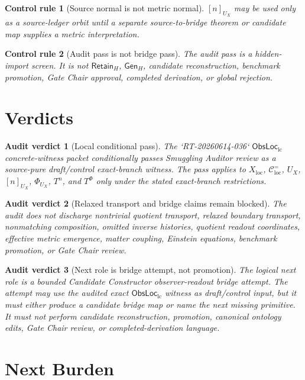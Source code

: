 \documentclass[11pt]{article}
\newcommand{\ObsLocLC}{\mathsf{ObsLoc}_{\mathrm{lc}}}
\newcommand{\RetainH}{\mathsf{Retain}_{H}}
\newcommand{\GenH}{\mathsf{Gen}_{H}}
\newtheorem{controlrule}{Control rule}
\newtheorem{verdict}{Audit verdict}
\begin{document}
\begin{controlrule}[Source normal is not metric normal]
\([n]_{U_X}\) may be used only as a source-ledger orbit until a
separate source-to-bridge theorem or candidate map supplies a metric
interpretation.
\end{controlrule}

\begin{controlrule}[Audit pass is not bridge pass]
The audit pass is a hidden-import screen. It is not \(\RetainH\),
\(\GenH\), candidate reconstruction, benchmark promotion, Gate Chair
approval, completed derivation, or global rejection.
\end{controlrule}

\section{Verdicts}

\begin{verdict}[Local conditional pass]
The `RT-20260614-036` \(\ObsLocLC\) concrete-witness packet
conditionally passes Smuggling Auditor review as a source-pure
draft/control exact-branch witness. The pass applies to
\(X_{\mathrm{loc}}\), \(\mathcal{C}^{=}_{\mathrm{loc}}\), \(U_X\),
\([n]_{U_X}\), \(\Phi_{U_X}\), \(T^n\), and \(T^\Phi\) only under the
stated exact-branch restrictions.
\end{verdict}

\begin{verdict}[Relaxed transport and bridge claims remain blocked]
The audit does not discharge nontrivial quotient transport, relaxed
boundary transport, nonmatching composition, omitted inverse histories,
quotient readout coordinates, effective metric emergence, matter
coupling, Einstein equations, benchmark promotion, or Gate Chair
review.
\end{verdict}

\begin{verdict}[Next role is bridge attempt, not promotion]
The logical next role is a bounded Candidate Constructor
observer-readout bridge attempt. The attempt may use the audited exact
\(\ObsLocLC\) witness as draft/control input, but it must either
produce a candidate bridge map or name the next missing primitive. It
must not perform candidate reconstruction, promotion, canonical
ontology edits, Gate Chair review, or completed-derivation language.
\end{verdict}

\section{Next Burden}
\end{document}
